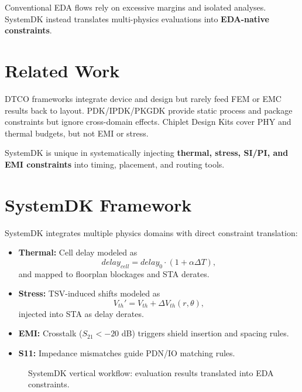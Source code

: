 \documentclass[conference]{IEEEtran}
\begin{document}
Conventional EDA flows rely on excessive margins and isolated analyses. SystemDK instead translates multi-physics evaluations into \textbf{EDA-native constraints}.

\section{Related Work}
DTCO frameworks integrate device and design but rarely feed FEM or EMC results back to layout. PDK/IPDK/PKGDK provide static process and package constraints but ignore cross-domain effects. Chiplet Design Kits cover PHY and thermal budgets, but not EMI or stress.

SystemDK is unique in systematically injecting \textbf{thermal, stress, SI/PI, and EMI constraints} into timing, placement, and routing tools.

\section{SystemDK Framework}
SystemDK integrates multiple physics domains with direct constraint translation:
\begin{itemize}
  \item \textbf{Thermal:} Cell delay modeled as
  \[
  delay_{cell} = delay_0 \cdot (1+\alpha \Delta T),
  \]
  and mapped to floorplan blockages and STA derates.
  \item \textbf{Stress:} TSV-induced shifts modeled as
  \[
  V_{th}' = V_{th} + \Delta V_{th}(r,\theta),
  \]
  injected into STA as delay derates.
  \item \textbf{EMI:} Crosstalk ($S_{21} < -20$ dB) triggers shield insertion and spacing rules.
  \item \textbf{S11:} Impedance mismatches guide PDN/IO matching rules.
\end{itemize}

\begin{figure}[htbp]
  \centering
  \caption{SystemDK vertical workflow: evaluation results translated into EDA constraints.}
  \label{fig:framework}
\end{figure}
\end{document}
